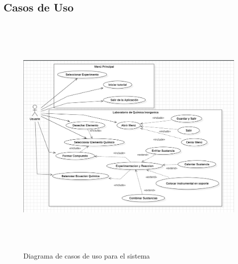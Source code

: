 \subsection{Casos de Uso}
\begin{figure}[H]
    \centering
    \includegraphics[width=1\textwidth, height=12cm]{img/chapter03/Casos de Uso.png}
    \caption{Diagrama de casos de uso para el sistema}\label{fig:Casos de Uso}
\end{figure}
\newpage
